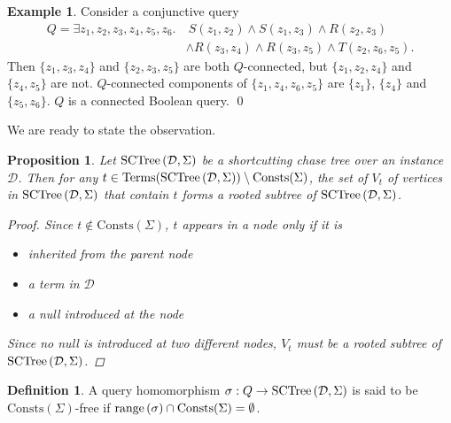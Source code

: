 \documentclass[12pt]{report}
\theoremstyle{plain}
\newtheorem{proposition}[theorem]{Proposition}
\theoremstyle{definition}
\newtheorem{definition}[theorem]{Definition}
\newtheorem{example}[theorem]{Example}
\def\Consts{{\mathrm{Consts}}}
\def\Terms{{\mathrm{Terms}}}
\newcommand{\range}[1]{\ensuremath{\normalfont{\operatorname{range}} \left( #1 \right)}}
\newcommand{\SCTree}[2]{\ensuremath{\normalfont{\textrm{SCTree}} \left( #1, #2 \right)}}
\begin{document}
\begin{example}
\label{query-connectedness-example}
  Consider a conjunctive query
  \begin{align*}
    Q = \exists z_1,z_2,z_3,z_4,z_5,z_6.&\ S(z_1, z_2) \wedge S(z_1,z_3) \wedge R(z_2, z_3) \\
    &\wedge R(z_3, z_4) \wedge R(z_3, z_5) \wedge T(z_2, z_6, z_5).
  \end{align*}
  Then $\{z_1, z_3, z_4\}$ and $\{z_2, z_3, z_5\}$ are both $Q$-connected, but $\{z_1, z_2, z_4\}$ and $\{z_4, z_5\}$ are not. $Q$-connected components of $\{z_1, z_4, z_6, z_5\}$ are $\{z_1\}$, $\{z_4\}$ and $\{z_5, z_6\}$. $Q$ is a connected Boolean query.
  \qed
\end{example}

We are ready to state the observation.

\begin{proposition}
\label{term-subtree-is-connected-for-non-rule-constants}
  Let $\SCTree{\mathcal{D}}{\Sigma}$ be a shortcutting chase tree over an instance $\mathcal{D}$. Then for any $t \in \Terms(\SCTree{\mathcal{D}}{\Sigma}) \setminus \Consts(\Sigma)$, the set of $V_t$ of vertices in $\SCTree{\mathcal{D}}{\Sigma}$ that contain $t$ forms a rooted subtree of $\SCTree{\mathcal{D}}{\Sigma}$.
  \begin{proof}
    Since $t \not\in \Consts(\Sigma)$, $t$ appears in a node only if it is
    \begin{itemize}
      \item inherited from the parent node
      \item a term in $\mathcal{D}$
      \item a null introduced at the node
    \end{itemize}
    Since no null is introduced at two different nodes, $V_t$ must be a rooted subtree of $\SCTree{\mathcal{D}}{\Sigma}$.
  \end{proof}
\end{proposition}

\begin{definition}
  A query homomorphism $\sigma: Q \rightarrow \SCTree{\mathcal{D}}{\Sigma}$ is said to be $\Consts(\Sigma)$-free if $\range{\sigma} \cap \Consts(\Sigma) = \emptyset$.
\end{definition}
\end{document}
